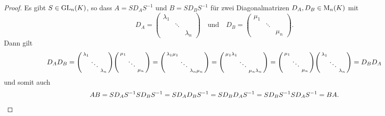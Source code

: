 \begin{proof}
  Es gibt $S \in \operatorname{GL}_{n}(K)$, so dass $A = S D_A S^{-1}$ und $B = S D_B S^{-1}$ für zwei Diagonalmatrizen $D_A, D_B \in \operatorname{M}_{n}(K)$ mit
  \[
      D_A
    = \begin{pmatrix}
        \lambda_1 &         &
        \\
                  & \ddots  &
        \\
                  &         & \lambda_n
      \end{pmatrix}
    \quad\text{und}\quad
      D_B
    = \begin{pmatrix}
        \mu_1 &         &
        \\
              & \ddots  &
        \\
              &         & \mu_n
      \end{pmatrix}.
  \]
  Dann gilt
  \[
      D_A D_B
    = \begin{psmallmatrix}
        \lambda_1 &         &
        \\
                  & \ddots  &
        \\
                  &         & \lambda_n
      \end{psmallmatrix}
      \begin{psmallmatrix}
        \mu_1 &         &
        \\
              & \ddots  &
        \\
              &         & \mu_n
      \end{psmallmatrix}
    = \begin{psmallmatrix}
        \lambda_1 \mu_1 &         &
        \\
                        & \ddots  &
        \\
                        &         & \lambda_n \mu_n
      \end{psmallmatrix}
    = \begin{psmallmatrix}
        \mu_1 \lambda_1 &         &
        \\
                        & \ddots  &
        \\
                        &         & \mu_n \lambda_n
      \end{psmallmatrix}
    = \begin{psmallmatrix}
        \mu_1 &         &
        \\
              & \ddots  &
        \\
              &         & \mu_n
      \end{psmallmatrix}
      \begin{psmallmatrix}
        \lambda_1 &         &
        \\
                  & \ddots  &
        \\
                  &         & \lambda_n
      \end{psmallmatrix}
    = D_B D_A
  \]
  und somit auch
  \[
      A B
    = S D_A S^{-1} S D_B S^{-1}
    = S D_A D_B S^{-1}
    = S D_B D_A S^{-1}
    = S D_B S^{-1} S D_A S^{-1}
    = B A.
  \qedhere
  \]
\end{proof}

